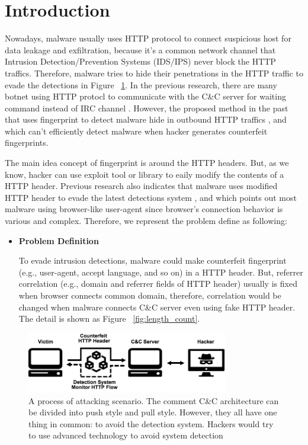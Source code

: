 \section{Introduction}

Nowadays, malware usually uses HTTP protocol to connect suspicious host for data leakage and exfiltration, because it's a common network channel that Intrusion Detection/Prevention Systems (IDS/IPS) never block the HTTP traffics. Therefore, malware tries to hide their penetrations in the HTTP traffic to evade the detections in Figure ~\ref{fig:attack}. In the previous research, there are many botnet using HTTP protocl to communicate with the C\&C server for waiting command instead of IRC channel \cite{gu2008botsniffer}. However, the proposed method in the past that uses fingerprint to detect malware hide in outbound HTTP traffics \cite{bortolameotti2017decanter}, and which can't efficiently detect malware when hacker generates counterfeit fingerprints.  

The main idea concept of fingerprint is around the HTTP headers. But, as we know, hacker can use exploit tool or library to eaily modify the contents of a HTTP header. Previous research also indicates that malware uses modified HTTP header to evade the latest detections system \cite{grill2014malware}, and which points out most malware using browser-like user-agent since browser's connection behavior is various and complex. Therefore, we represent the problem define as following:

\begin{itemize}

\item {\bf Problem Definition}

To evade intrusion detections, malware could make counterfeit fingerprint (e.g., user-agent, accept language, and so on) in a HTTP header. But, referrer correlation (e.g., domain and referrer fields of HTTP header) usually is fixed when browser connects common domain, therefore, correlation would be changed when malware connects C\&C server even using fake HTTP header. The detail is shown as Figure ~\ref{fig:length_count}.

\end{itemize}

\begin{figure}[!t]
\centering
\includegraphics[width=250pt]{image/attack.png}
\caption{A process of attacking scenario. The comment C\&C architecture can be divided into push style and pull style. However, they all have one thing in common: to avoid the detection system. Hackers would try to use advanced technology to avoid system detection}
\label{fig:attack}
\end{figure}


